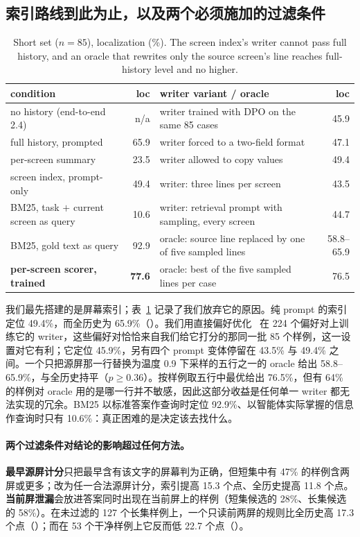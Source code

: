 \subsection{索引路线到此为止，以及两个必须施加的过滤条件}
\label{sec:index}
\begin{table}[t]
\centering\scriptsize\engfont
\caption{\rm Short set ($n=85$), localization (\%). The screen index's writer cannot pass full history, and an oracle that rewrites only the source screen's line reaches full-history level and no higher.}
\label{tab:index}
\begin{tabular}{lr@{\hspace{2em}}lr}
\toprule
condition & loc & writer variant / oracle & loc \\
\midrule
no history (end-to-end 2.4) & n/a & writer trained with DPO on the same 85 cases & 45.9 \\
full history, prompted & 65.9 & writer forced to a two-field format & 47.1 \\
per-screen summary & 23.5 & writer allowed to copy values & 49.4 \\
screen index, prompt-only & 49.4 & writer: three lines per screen & 43.5 \\
BM25, task $+$ current screen as query & 10.6 & writer: retrieval prompt with sampling, every screen & 44.7 \\
BM25, gold text as query & 92.9 & oracle: source line replaced by one of five sampled lines & 58.8--65.9 \\
\textbf{per-screen scorer, trained} & \textbf{77.6} & oracle: best of the five sampled lines per case & 76.5 \\
\bottomrule
\end{tabular}
\end{table}

我们最先搭建的是屏幕索引；表~\ref{tab:index} 记录了我们放弃它的原因。纯 prompt 的索引定位 49.4\%，而全历史为 65.9\%（）。我们用直接偏好优化~\citep{dpo} 在 224 个偏好对上训练它的 writer，这些偏好对恰恰来自我们给它打分的那同一批 85 个样例，这一设置对它有利；它定位 45.9\%，另有四个 prompt 变体停留在 43.5\% 与 49.4\% 之间。一个只把源屏那一行替换为温度 0.9 下采样的五行之一的 oracle 给出 58.8--65.9\%，与全历史持平（$p\ge0.36$）。按样例取五行中最优给出 76.5\%，但有 64\% 的样例对 oracle 用的是哪一行并不敏感，因此这部分收益是任何单一 writer 都无法实现的冗余。BM25 以标准答案作查询时定位 92.9\%、以智能体实际掌握的信息作查询时只有 10.6\%：真正困难的是决定该去找什么。

\paragraph{两个过滤条件对结论的影响超过任何方法。} \textbf{最早源屏计分}只把最早含有该文字的屏幕判为正确，但短集中有 47\% 的样例含两屏或更多；改为任一合法源屏计分，索引提高 15.3 个点、全历史提高 11.8 个点。\textbf{当前屏泄漏}会放进答案同时出现在当前屏上的样例（短集候选的 28\%、长集候选的 58\%）。在未过滤的 127 个长集样例上，一个只读前两屏的规则比全历史高 17.3 个点（）；而在 53 个干净样例上它反而低 22.7 个点（）。


